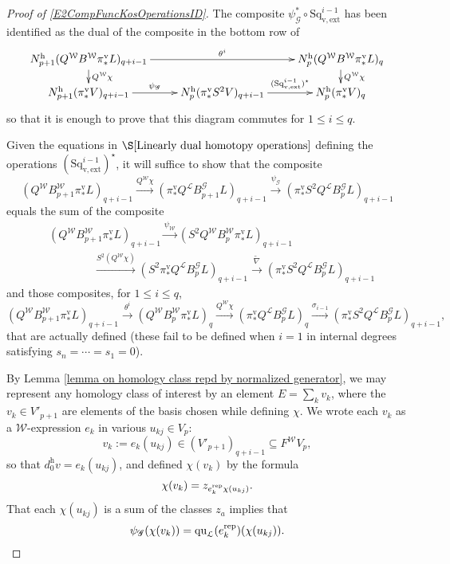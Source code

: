 \documentclass[11pt]{amsart} \renewcommand{\baselinestretch}{1.4}
\theoremstyle{plain}
\theoremstyle{definition}
\renewcommand{\to}{\longrightarrow}
\newcommand{\from}{\longleftarrow}
\newcommand{\scrG}{\mathscr{G}}
\newcommand{\calL}{\mathcal{L}}
\newcommand{\calw}{\mathcal{W}}
\newcommand{\call}{\mathcal{L}}
\newcommand{\BSW}{{\scrG}}
\newcommand{\BSWres}{B^\BSW}%
\newcommand{\quadratic}{\mathrm{qu}}
\newcommand{\vExtCohOp}{\mathrm{Sq}_\mathrm{v,ext}}
\newcommand{\uver}{^\mathrm{v}}
\newcommand{\uhor}{^\mathrm{h}}
\begin{document}
\begin{Operations in composite functor spectral sequences}
\begin{proof}[Proof of \ref{E2CompFuncKosOperationsID}]
The composite $\psi_\BSW^*\circ\vExtCohOp^{i-1}$ has been identified as the dual of the composite in the bottom row of
\[\xymatrix@R=4mm{
N\uhor_{p+1}(Q^{\calw}B^{\calw}\pi\uver_*L)_{q+i-1}\ar[rr]^-{\theta^i}
\ar[d]^-{Q^{\calw}\chi}
&%
&%
N\uhor_p(Q^{\calw}B^{\calw}\pi\uver_*L)_q\ar[d]^-{Q^{\calw}\chi}
\\%
N\uhor_{p+1}(\pi\uver_*V)_{q+i-1}\ar[r]^-{\psi_\BSW}
&%
N\uhor_{p}(\pi\uver_*S^2V)_{q+i-1}\ar[r]^-{(\vExtCohOp^{i-1})^\star}
&%
N\uhor_p(\pi\uver_*V)_q%
}\]
so that it is enough to prove that this diagram commutes for $1\leq i\leq q$.

Given the equations in $\S\ref{Linearly dual homotopy operations}$ defining the operations $(\vExtCohOp^{i-1})^\star$, it will suffice to show that the composite
\[(Q^{\calw}B^{\calw}_{p+1}\pi\uver_*L)_{q+i-1}\overset{Q^{\calw}\chi}{\to}(\pi\uver_*Q^{\calL}\BSWres_{p+1}L)_{q+i-1}\overset{\psi_\BSW}{\to}(\pi\uver_*S^2Q^{\calL}\BSWres_pL)_{q+i-1}\]
equals the sum of the composite
\[\begin{split}
&(Q^{\calw}B^{\calw}_{p+1}\pi\uver_* L)_{q+i-1}\overset{\psi_{\calw}}{\to}(S^2Q^{\calw}B^{\calw}_{p}\pi\uver_* L)_{q+i-1}\\
 &\qquad\qquad \overset{S^2(Q^{\calw}\chi)}{\to}
(S^2\pi\uver_*Q^{\call}\BSWres_pL)_{q+i-1}\overset{\widetilde{\nabla}}{\to}
(\pi\uver_*S^2Q^{\calL}\BSWres_{p}L)_{q+i-1}
\end{split}\]
and those composites, for $1\leq i \leq q$,
\[(Q^{\calw}B^{\calw}_{p+1}\pi\uver_* L)_{q+i-1}\overset{\theta^i}{\to} (Q^{\calw}B^{\calw}_{p}\pi\uver_* L)_q\overset{Q^{\calw}\chi}{\to} (\pi\uver_*Q^{\call}\BSWres_{p}L)_q\overset{\sigma_{i-1}}{\to} (\pi\uver_*S^2Q^{\calL}\BSWres_{p}L)_{q+i-1},\]
that are actually defined (these fail to be defined when $i=1$ in internal degrees satisfying $s_n=\cdots =s_1=0$). 


By Lemma \ref{lemma on homology class repd by normalized generator}, we may represent any homology class of interest by an element $E=\sum_kv_k$, where the $v_k\in V'_{p+1}$ are elements of the basis chosen while defining $\chi$. We wrote each $v_k$ as a $\calw$-expression $e_k$ in various $u_{kj}\in V_{p}$:
\[v_k:=e_{k}(u_{kj})\in (V'_{p+1})_{q+i-1}\subseteq F^{\calw}V_p,\]
so that $d\uhor_0v=e_k(u_{kj})$, and  defined  $\chi(v_k)$ by the formula 
\[\chi(v_k)=z_{e_{k}^\textup{rep}\chi(u_{kj})}.\]
That each $\chi(u_{kj})$ is a sum of the classes $z_a$ implies that 
\[\psi_\BSW(\chi(v_k))=\quadratic_{\calL}(e_{k}^\textup{rep})(\chi(u_{kj})).\]


\end{proof}
\end{Operations in composite functor spectral sequences}
\end{document}
